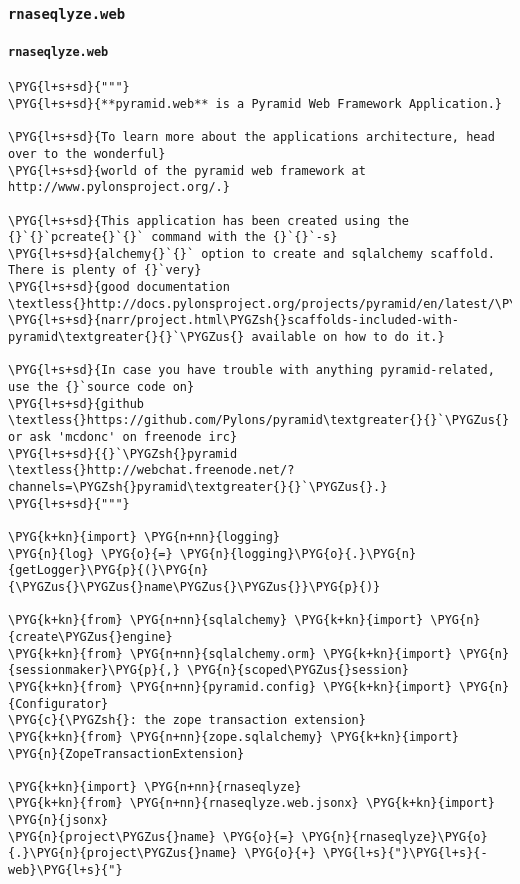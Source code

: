 \subsubsection{\texttt{rnaseqlyze.web}}
\label{index-pdf4:rnaseqlyze-web}

\paragraph{\texttt{rnaseqlyze.web}}
\label{index-pdf4:id4}
\begin{Verbatim}[commandchars=\\\{\}]
\PYG{l+s+sd}{"""}
\PYG{l+s+sd}{**pyramid.web** is a Pyramid Web Framework Application.}

\PYG{l+s+sd}{To learn more about the applications architecture, head over to the wonderful}
\PYG{l+s+sd}{world of the pyramid web framework at http://www.pylonsproject.org/.}

\PYG{l+s+sd}{This application has been created using the {}`{}`pcreate{}`{}` command with the {}`{}`-s}
\PYG{l+s+sd}{alchemy{}`{}` option to create and sqlalchemy scaffold. There is plenty of {}`very}
\PYG{l+s+sd}{good documentation \textless{}http://docs.pylonsproject.org/projects/pyramid/en/latest/\PYGZbs{}}
\PYG{l+s+sd}{narr/project.html\PYGZsh{}scaffolds-included-with-pyramid\textgreater{}{}`\PYGZus{} available on how to do it.}

\PYG{l+s+sd}{In case you have trouble with anything pyramid-related, use the {}`source code on}
\PYG{l+s+sd}{github \textless{}https://github.com/Pylons/pyramid\textgreater{}{}`\PYGZus{} or ask 'mcdonc' on freenode irc}
\PYG{l+s+sd}{{}`\PYGZsh{}pyramid \textless{}http://webchat.freenode.net/?channels=\PYGZsh{}pyramid\textgreater{}{}`\PYGZus{}.}
\PYG{l+s+sd}{"""}

\PYG{k+kn}{import} \PYG{n+nn}{logging}
\PYG{n}{log} \PYG{o}{=} \PYG{n}{logging}\PYG{o}{.}\PYG{n}{getLogger}\PYG{p}{(}\PYG{n}{\PYGZus{}\PYGZus{}name\PYGZus{}\PYGZus{}}\PYG{p}{)}

\PYG{k+kn}{from} \PYG{n+nn}{sqlalchemy} \PYG{k+kn}{import} \PYG{n}{create\PYGZus{}engine}
\PYG{k+kn}{from} \PYG{n+nn}{sqlalchemy.orm} \PYG{k+kn}{import} \PYG{n}{sessionmaker}\PYG{p}{,} \PYG{n}{scoped\PYGZus{}session}
\PYG{k+kn}{from} \PYG{n+nn}{pyramid.config} \PYG{k+kn}{import} \PYG{n}{Configurator}
\PYG{c}{\PYGZsh{}: the zope transaction extension}
\PYG{k+kn}{from} \PYG{n+nn}{zope.sqlalchemy} \PYG{k+kn}{import} \PYG{n}{ZopeTransactionExtension}

\PYG{k+kn}{import} \PYG{n+nn}{rnaseqlyze}
\PYG{k+kn}{from} \PYG{n+nn}{rnaseqlyze.web.jsonx} \PYG{k+kn}{import} \PYG{n}{jsonx}
\PYG{n}{project\PYGZus{}name} \PYG{o}{=} \PYG{n}{rnaseqlyze}\PYG{o}{.}\PYG{n}{project\PYGZus{}name} \PYG{o}{+} \PYG{l+s}{"}\PYG{l+s}{-web}\PYG{l+s}{"}


\end{Verbatim}
